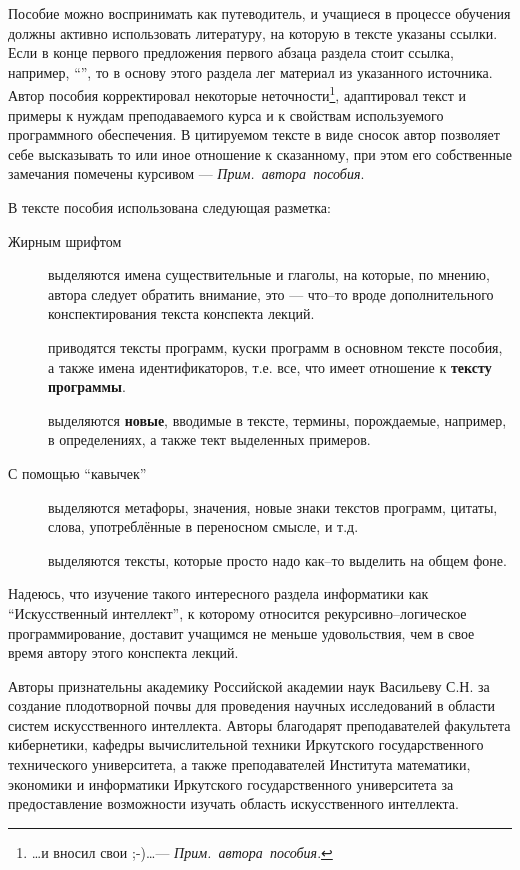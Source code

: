 \documentclass[12pt, openany, twoside]{book} %
\def\AR{{\em Прим.~автора~пособия}}
\begin{document}
Пособие можно воспринимать как путеводитель, и учащиеся в процессе обучения должны активно использовать литературу, на которую в тексте указаны ссылки. Если в конце первого предложения первого абзаца раздела стоит ссылка, например, ``\cite{AIDictionary}'', то в основу этого раздела лег материал из указанного источника. Автор пособия корректировал некоторые неточности\footnote{\ldots и вносил свои ;-)\ldots --- \AR.}, адаптировал текст и примеры к нуждам преподаваемого курса и к свойствам используемого программного обеспечения. В цитируемом тексте в виде сносок автор позволяет себе высказывать то или иное отношение к сказанному, при этом его собственные замечания помечены курсивом --- \AR.

В тексте пособия использована следующая разметка:
\begin{description}
\item[Жирным шрифтом] выделяются имена существительные и глаголы, на которые, по мнению, автора следует обратить внимание, это --- что--то вроде дополнительного конспектирования текста конспекта лекций.
\item[] приводятся тексты программ, куски программ в основном тексте пособия, а также имена идентификаторов, т.е. все, что имеет отношение к {\bf тексту программы}.
\item[] выделяются {\bf новые}, вводимые в тексте, термины, порождаемые, например, в определениях, а также тект выделенных примеров.
\item[\normalfont С помощью ``кавычек''] выделяются метафоры, значения, новые знаки текстов программ, цитаты, слова,
употреблённые в переносном смысле, и т.д. \item[] вы\-де\-ля\-ю\-тся тексты, которые просто надо как--то выделить на общем фоне.
\end{description}

Надеюсь, что изучение такого интересного раздела информатики как ``Искусственный интеллект'', к которому относится рекурсивно--логическое программирование, доставит учащимся не меньше удовольствия, чем в свое время автору этого конспекта лекций.

Авторы признательны академику Российской академии наук Васильеву С.Н. за создание плодотворной почвы для проведения научных исследований в области систем искусственного интеллекта. Авторы благодарят преподавателей факультета кибернетики, кафедры вычислительной техники Иркутского государственного технического университета, а также преподавателей Института математики, экономики и информатики Иркутского государственного университета за предоставление возможности изучать область искусственного интеллекта.
\end{document}
